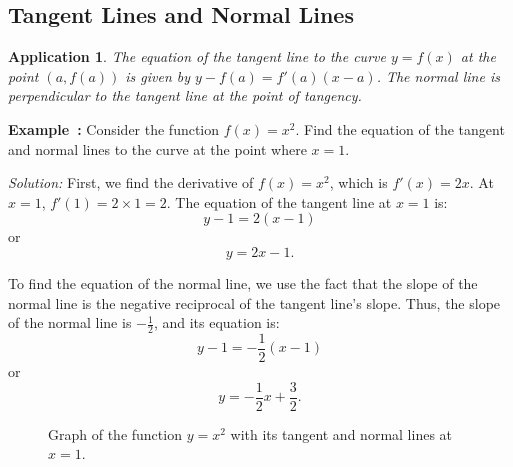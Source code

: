 \documentclass[a4paper,12pt]{book}
\newenvironment{solution}[1][]
{\par\noindent\textit{Solution:} \rmfamily}{\medskip}
\newcounter{example}
\newenvironment{example}[1][\theexample]
  {\refstepcounter{example}\par\medskip\noindent\textbf{Example~#1:} \rmfamily}
  {\medskip}
\newtheorem{application}{Application}
\begin{document}
\subsection{Tangent Lines and Normal Lines}
\begin{application}
The equation of the tangent line to the curve \( y = f(x) \) at the point \( (a, f(a)) \) is given by \( y - f(a) = f'(a)(x - a) \). The normal line is perpendicular to the tangent line at the point of tangency.
\end{application}

\begin{example}
Consider the function \( f(x) = x^2 \). Find the equation of the tangent and normal lines to the curve at the point where \( x = 1 \).
\end{example}

\begin{solution}
First, we find the derivative of \( f(x) = x^2 \), which is \( f'(x) = 2x \). At \( x = 1 \), \( f'(1) = 2 \times 1 = 2 \). The equation of the tangent line at \( x = 1 \) is:
\[ y - 1 = 2(x - 1) \]
or
\[ y = 2x - 1. \]

To find the equation of the normal line, we use the fact that the slope of the normal line is the negative reciprocal of the tangent line's slope. Thus, the slope of the normal line is \( -\frac{1}{2} \), and its equation is:
\[ y - 1 = -\frac{1}{2}(x - 1) \]
or
\[ y = -\frac{1}{2}x + \frac{3}{2}. \]
\end{solution}

\begin{figure}[H]
\centering
{}
\caption{Graph of the function \(y = x^2\) with its tangent and normal lines at \(x = 1\).}
\end{figure}
\end{document}
